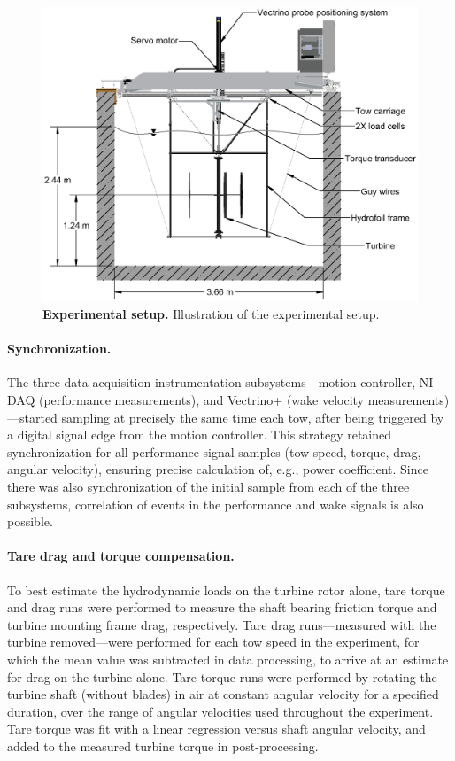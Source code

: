 \documentclass[10pt,letterpaper]{article}
\begin{document}
\begin{figure}
    \centering

    \includegraphics[clip,trim=0.01in 0 0 0,
    width=\textwidth]{figures/tank_cross_section}

    \caption{{\bf Experimental setup.} Illustration of the experimental setup.}

    \label{fig:exp-setup}
\end{figure}


\paragraph{Synchronization.} The three data acquisition instrumentation
subsystems---motion controller, NI DAQ (performance measurements), and Vectrino+
(wake velocity measurements)---started sampling at precisely the same time each
tow, after being triggered by a digital signal edge from the motion controller.
This strategy retained synchronization for all performance signal samples (tow
speed, torque, drag, angular velocity), ensuring precise calculation of, e.g.,
power coefficient. Since there was also synchronization of the initial sample
from each of the three subsystems, correlation of events in the performance and
wake signals is also possible.

\paragraph{Tare drag and torque compensation.} To best estimate the hydrodynamic
loads on the turbine rotor alone, tare torque and drag runs were performed to
measure the shaft bearing friction torque and turbine mounting frame drag,
respectively. Tare drag runs---measured with the turbine removed---were
performed for each tow speed in the experiment, for which the mean value was
subtracted in data processing, to arrive at an estimate for drag on the turbine
alone. Tare torque runs were performed by rotating the turbine shaft (without
blades) in air at constant angular velocity for a specified duration, over the
range of angular velocities used throughout the experiment. Tare torque was fit
with a linear regression versus shaft angular velocity, and added to the
measured turbine torque in post-processing.
\end{document}
